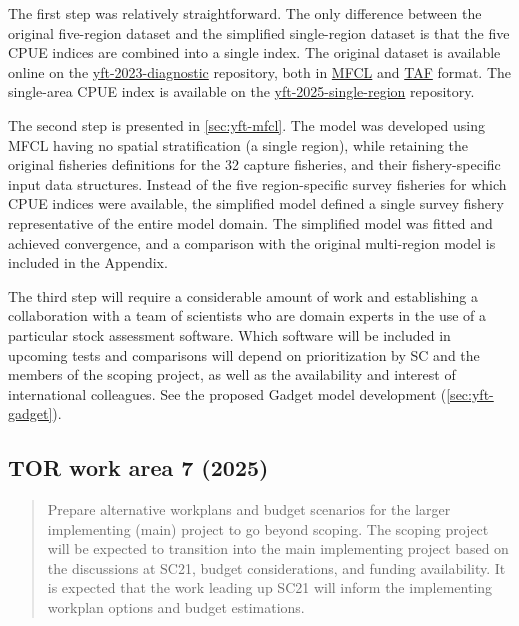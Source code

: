 \documentclass{SCreport}
\newcommand\ofpsam{https://github.com/PacificCommunity/ofp-sam}
\begin{document}
The first step was relatively straightforward. The only difference between the
original five-region dataset and the simplified single-region dataset is that
the five CPUE indices are combined into a single index. The original dataset is
available online on the \href{\ofpsam-yft-2023-diagnostic}{yft-2023-diagnostic}
repository, both in \href{\ofpsam-yft-2023-diagnostic/tree/main/MFCL}{MFCL} and
\href{\ofpsam-yft-2023-diagnostic/tree/main/TAF/data}{TAF} format. The
single-area CPUE index is available on the
\href{\ofpsam-yft-2025-single-region/blob/main/data/cpue/cpue_quarter.csv}
{yft-2025-single-region} repository.

The second step is presented in \autoref{sec:yft-mfcl}. The model was developed
using MFCL having no spatial stratification (a single region), while retaining
the original fisheries definitions for the 32 capture fisheries, and their
fishery-specific input data structures. Instead of the five region-specific
survey fisheries for which CPUE indices were available, the simplified model
defined a single survey fishery representative of the entire model domain. The
simplified model was fitted and achieved convergence, and a comparison with the
original multi-region model is included in the Appendix.

The third step will require a considerable amount of work and establishing a
collaboration with a team of scientists who are domain experts in the use of a
particular stock assessment software. Which software will be included in
upcoming tests and comparisons will depend on prioritization by SC and the
members of the scoping project, as well as the availability and interest of
international colleagues. See the proposed Gadget model development
(\autoref{sec:yft-gadget}).

\vspace{2ex}

\hypertarget{link:tor-7}{}
\subsection{TOR work area 7 (2025)}
\label{sec:tor-7}

\begin{quote}\sf
  Prepare alternative workplans and budget scenarios for the larger implementing
  (main) project to go beyond scoping. The scoping project will be expected to
  transition into the main implementing project based on the discussions at
  SC21, budget considerations, and funding availability. It is expected that the
  work leading up SC21 will inform the implementing workplan options and budget
  estimations.
\end{quote}
\end{document}
